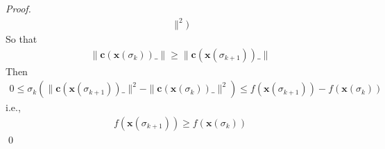 \documentclass[runningheads]{llncs}
\begin{document}
\begin{proof}
\begin{align}
        \parallel^2)
    \end{align}
    So that
    \begin{align}
        \parallel \mathbf{c}(\mathbf{x}(\sigma_{k}))\_ 
        \parallel \geq \parallel \mathbf{c}(\mathbf{x}(\sigma_{k+1}))\_ 
        \parallel
    \end{align}
    Then
    \begin{align}
        0\leq \sigma_{k} (\parallel \mathbf{c}(\mathbf{x}(\sigma_{k+1}))\_ 
        \parallel^2 - \parallel \mathbf{c}(\mathbf{x}(\sigma_{k}))\_ 
        \parallel^2)
        \leq
        f(\mathbf{x}(\sigma_{k+1})) - f(\mathbf{x}(\sigma_{k}))
    \end{align}
    i.e.,
    \begin{align}
        f(\mathbf{x}(\sigma_{k+1})) \geq f(\mathbf{x}(\sigma_{k}))
    \end{align}
    \qed
\end{proof}
\end{document}
